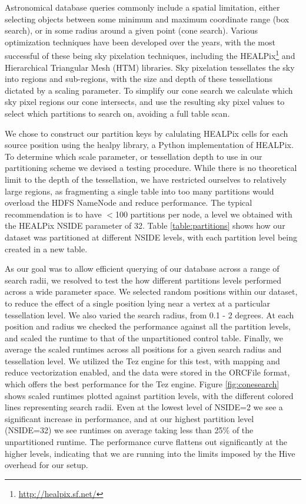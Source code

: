 \documentclass[11pt,twoside]{article}
\begin{document}
Astronomical database queries commonly include a spatial limitation, either selecting objects between some
minimum and maximum coordinate range (box search), or in some radius around a given point (cone
search). Various optimization techniques have been developed over the years, with the most successful of these
being sky pixelation techniques, including the HEALPix\footnote{\url{http://healpix.sf.net/}} and Hierarchical
Triangular Mesh (HTM) libraries. Sky pixelation tessellates the sky into regions and sub-regions, with the
size and depth of these tessellations dictated by a scaling parameter. To simplify our cone search we
calculate which sky pixel regions our cone intersects, and use the resulting sky pixel values to select which
partitions to search on, avoiding a full table scan.

We chose to construct our partition keys by calulating HEALPix cells for each source position using the healpy
library, a Python implementation of HEALPix. To determine which scale parameter, or tessellation depth to use
in our partitioning scheme we devised a testing procedure.  While there is no theoretical limit to the depth
of the tessellation, we have restricted ourselves to relatively large regions, as fragmenting a single table
into too many partitions would overload the HDFS NameNode and reduce performance. The typical recommendation
is to have $<$100 partitions per node, a level we obtained with the HEALPix NSIDE parameter of 32. Table
\ref{table:partitions} shows how our dataset was partitioned at different NSIDE levels, with each partition
level being created in a new table.

As our goal was to allow efficient querying of our database across a range of search radii, we resolved to
test the how different partitions levels performed across a wide parameter space.  We selected random
positions within our dataset, to reduce the effect of a single position lying near a vertex at a particular
tessellation level. We also varied the search radius, from 0.1 - 2 degrees. At each position and radius we
checked the performance against all the partition levels, and scaled the runtime to that of the unpartitioned
control table.  Finally, we average the scaled runtimes across all positions for a given search radius and
tessellation level.  We utilized the Tez engine for this test, with mapping and reduce vectorization enabled,
and the data were stored in the ORCFile format, which offers the best performance for the Tez engine. Figure
\ref{fig:conesearch} shows scaled runtimes plotted against partition levels, with the different colored lines
representing search radii. Even at the lowest level of NSIDE=2 we see a significant increase in performance, and at our highest partition
level (NSIDE=32) we see runtimes on average taking less than 25\% of the unpartitioned runtime.  The
performance curve flattens out significantly at the higher levels, indicating that we are running into the
limits imposed by the Hive overhead for our setup.
\end{document}
